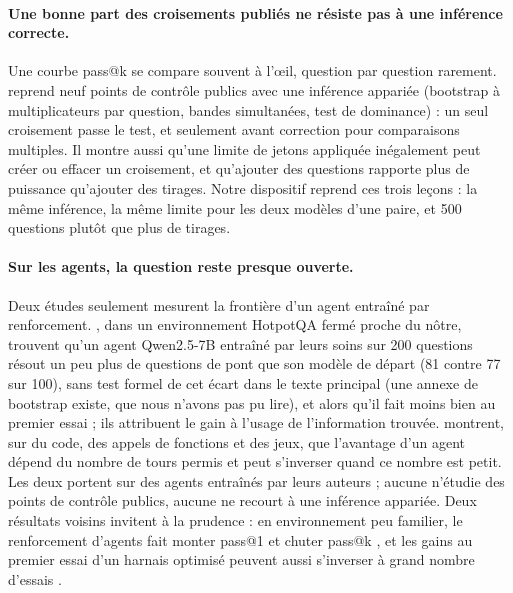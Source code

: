 \paragraph{Une bonne part des croisements publiés ne résiste pas à une inférence correcte.} Une courbe pass@k se compare souvent à l'œil, question par question rarement. \citet{yang2026crossovers} reprend neuf points de contrôle publics avec une inférence appariée (bootstrap à multiplicateurs par question, bandes simultanées, test de dominance) : un seul croisement passe le test, et seulement avant correction pour comparaisons multiples. Il montre aussi qu'une limite de jetons appliquée inégalement peut créer ou effacer un croisement, et qu'ajouter des questions rapporte plus de puissance qu'ajouter des tirages. Notre dispositif reprend ces trois leçons : la même inférence, la même limite pour les deux modèles d'une paire, et 500 questions plutôt que plus de tirages.

\paragraph{Sur les agents, la question reste presque ouverte.} Deux études seulement mesurent la frontière d'un agent entraîné par renforcement. \citet{zhai2026does}, dans un environnement HotpotQA fermé proche du nôtre, trouvent qu'un agent Qwen2.5-7B entraîné par leurs soins sur 200 questions résout un peu plus de questions de pont que son modèle de départ (81 contre 77 sur 100), sans test formel de cet écart dans le texte principal (une annexe de bootstrap existe, que nous n'avons pas pu lire), et alors qu'il fait moins bien au premier essai ; ils attribuent le gain à l'usage de l'information trouvée. \citet{zhu2026what} montrent, sur du code, des appels de fonctions et des jeux, que l'avantage d'un agent dépend du nombre de tours permis et peut s'inverser quand ce nombre est petit. Les deux portent sur des agents entraînés par leurs auteurs ; aucune n'étudie des points de contrôle publics, aucune ne recourt à une inférence appariée. Deux résultats voisins invitent à la prudence : en environnement peu familier, le renforcement d'agents fait monter pass@1 et chuter pass@k \citep{chen2026explore}, et les gains au premier essai d'un harnais optimisé peuvent aussi s'inverser à grand nombre d'essais \citep{kim2026elicitation}.

